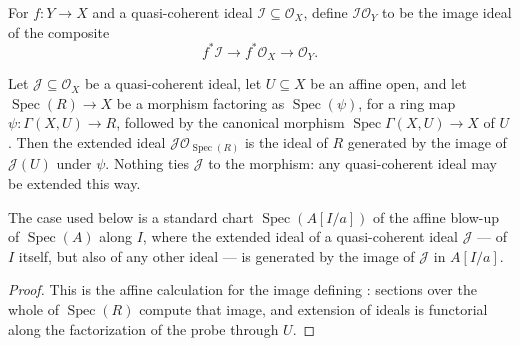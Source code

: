 \begin{definition}
  \label{def:nagata-extended-ideal}
  \leanok

  For $f\colon Y\to X$ and a quasi-coherent ideal
  $\mathcal I\subseteq\mathcal O_X$, define
  $\mathcal I\mathcal O_Y$ to be the image ideal of the composite
  \[
    f^*\mathcal I\longrightarrow f^*\mathcal O_X
      \longrightarrow\mathcal O_Y.
  \]
\end{definition}

\begin{lemma}
  \label{lemma:nagata-extended-ideal-affine-chart}
  \leanok

  Let $\mathcal J\subseteq\mathcal O_X$ be a quasi-coherent ideal, let
  $U\subseteq X$ be an affine open, and let $\operatorname{Spec}(R)\to X$ be
  a morphism factoring as $\operatorname{Spec}(\psi)$, for a ring map
  $\psi\colon\Gamma(X,U)\to R$, followed by the canonical morphism
  $\operatorname{Spec}\Gamma(X,U)\to X$ of $U$.  Then the extended ideal
  $\mathcal J\mathcal O_{\operatorname{Spec}(R)}$ is the ideal of $R$
  generated by the image of $\mathcal J(U)$ under $\psi$.  Nothing ties
  $\mathcal J$ to the morphism: any quasi-coherent ideal may be extended this
  way.

  The case used below is a standard chart
  $\operatorname{Spec}(A[I/a])$ of the affine blow-up of
  $\operatorname{Spec}(A)$ along $I$, where the extended ideal of a
  quasi-coherent ideal $\mathcal J$ --- of $I$ itself, but also of any other
  ideal --- is generated by the image of $\mathcal J$ in $A[I/a]$.
\end{lemma}

\begin{proof}
  \leanok
  This is the affine calculation for the image defining
  : sections over the whole of
  $\operatorname{Spec}(R)$ compute that image, and extension of ideals is
  functorial along the factorization of the probe through $U$.
\end{proof}

